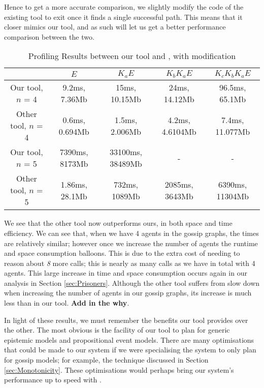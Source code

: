 \documentclass[10pt, a4paper]{report}
\begin{document}
Hence to get a more accurate comparison, we slightly modify the code of the
existing tool to exit once it finds a single successful path. This means that it
closer mimics our tool, and as such will let us get a better performance
comparison between the two. 


\begin{table}[h]
  \centering
  \begin{tabular}{|c||c|c|c|c|}
    \hline
    & $E$ & $ K_a E$ & $K_b K_a E$ & $K_c K_b K_a E$ \\ \hline 
    Our tool, $n$ = 4 & 9.2ms, 7.36Mb & 15ms, 10.15Mb & 24ms, 14.12Mb & 96.5ms, 65.1Mb \\ \hline
    Other tool, $n$ = 4 & 0.6ms, 0.694Mb & 1.5ms, 2.006Mb & 4.2ms, 4.6104Mb & 7.4ms, 11.077Mb \\ \hline \hline
    Our tool, $n$ = 5 & 7390ms, 8173Mb & 33100ms, 38489Mb & - & - \\ \hline
    Other tool, $n$ = 5 & 1.86ms, 28.1Mb & 732ms, 1089Mb & 2085ms, 3643Mb & 6390ms, 11304Mb \\
    \hline
  \end{tabular}
  \caption{Profiling Results between our tool and \cite{GithubGossip}, with modification}
  \label{tab:Proflining2}
\end{table}

We see that the other tool now outperforms ours, in both space and time
efficiency. We can see that, when we have 4 agents in the gossip graphs, the
times are relatively similar; however once we increase the number of agents the
runtime and space consumption balloons. This is due to the extra cost of needing
to reason about \emph{8} more calls; this is nearly as many calls as we have
in total with 4 agents. This large increase in time and space consumption occurs
again in our analysis in Section \ref{sec:Prisoners}. Although the other tool
suffers from slow down when increasing the number of agents in our gossip
graphs, its increase is much less than in our tool. \textbf{Add in the why}.

In light of these results, we must remember the benefits our tool provides over
the other. The most obvious is the facility of our tool to plan for generic
epistemic models and propositional event models. There are many optimisations
that could be made to our system if we were specialising the system to only plan
for gossip models; for example, the technique discussed in Section
\ref{sec:Monotonicity}. These optimisations would perhaps bring our system's
performance up to speed with \cite{GithubGossip}. 
\end{document}
